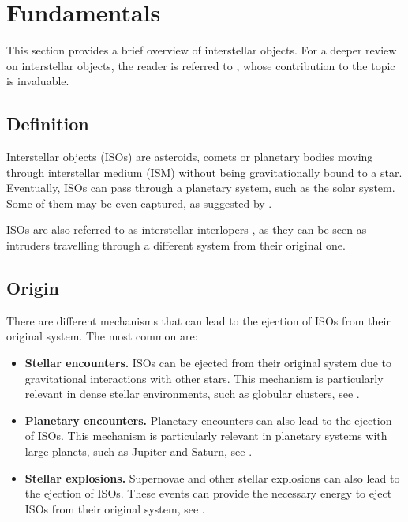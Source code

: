 \section{Fundamentals}

This section provides a brief overview of interstellar objects. For a deeper
review on interstellar objects, the reader is referred to \cite{jewitt2022},
whose contribution to the topic is invaluable.

\subsection{Definition}
Interstellar objects (ISOs) are asteroids, comets or planetary bodies moving
through interstellar medium (ISM) without being gravitationally bound to a star.
Eventually, ISOs can pass through a planetary system, such as the solar system.
Some of them may be even captured, as suggested by \cite{napier2021}.

ISOs are also referred to as interstellar interlopers , as they
can be seen as intruders travelling through a different system from their
original one.

\subsection{Origin}
There are different mechanisms that can lead to the ejection of ISOs from their
original system. The most common are:

\begin{itemize}
  \item \textbf{Stellar encounters.} ISOs can be ejected from their original
        system due to gravitational interactions with other stars. This
        mechanism is particularly relevant in dense stellar environments, such
        as globular clusters, see \cite{fouchard2011}.

  \item \textbf{Planetary encounters.} Planetary encounters can also lead to
        the ejection of ISOs. This mechanism is particularly relevant in
        planetary systems with large planets, such as Jupiter and Saturn, see
        \cite{horner2003}.

  \item \textbf{Stellar explosions.} Supernovae and other stellar explosions
        can also lead to the ejection of ISOs. These events can provide the
        necessary energy to eject ISOs from their original system, see
        \cite{portegies2018}.
\end{itemize}

